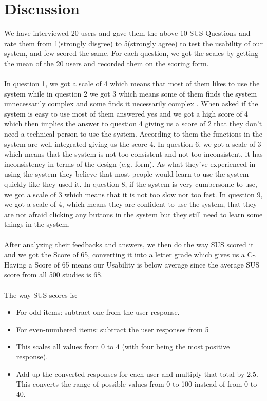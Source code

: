 \documentclass{report}
\begin{document}
\section{Discussion}
We have interviewed 20 users and gave them the above 10 SUS Questions and rate them from 1(strongly disgree) to 5(strongly agree) to test the usability of our system, and few scored the same. For each question, we got the scales by getting the mean of the 20 users and recorded them on the scoring form.
\\ \\In question 1, we got a scale of 4 which means that most of them likes to use the system while in question 2 we got 3 which means some of them finds the system unnecessarily complex and some finds it necessarily complex . When asked if the system is easy to use most of them answered yes and we got a high score of 4 which then implies the answer to question 4 giving us a score of 2 that they don't need a technical person to use the system. According to them the functions in the system are well integrated  giving us the score 4. In question 6, we got a scale of 3 which means that the system is not too consistent and not too inconsistent, it has inconsistency in terms of the design (e.g. form). As what they've experienced in using the system they believe that most people would learn to use the system quickly like they used it. In question 8, if the system is very cumbersome to use, we got a scale of 3 which means that it is not too slow nor too fast. In question 9, we got a scale of 4, which means they are confident to use the system, that they are not afraid clicking any buttons in the system but they still need to learn some things in the system.
\\\\After analyzing their feedbacks and answers, we then do the way SUS scored it and we got the Score of 65, converting it into a letter grade which gives us a C-. Having a Score of 65 means our Usability is below average since the average SUS score from all 500 studies is 68.
\\\\The way SUS scores is:
\begin{itemize}
\item For odd items: subtract one from the user response.
\item For even-numbered items: subtract the user responses from 5
\item This scales all values from 0 to 4 (with four being the most positive response).
\item Add up the converted responses for each user and multiply that total by 2.5. This converts the range of possible values from 0 to 100 instead of from 0 to 40.
\end{itemize}
\end{document}
